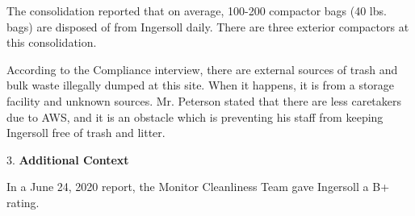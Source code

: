 The consolidation reported that on average, 100-200 compactor bags (40 lbs. bags) are disposed of from Ingersoll daily. There are three exterior compactors at this consolidation. 

According to the Compliance interview, there are external sources of trash and bulk waste illegally dumped at this site. When it happens, it is from a storage facility and unknown sources. Mr. Peterson stated that there are less caretakers due to AWS, and it is an obstacle which is preventing his staff from keeping Ingersoll free of trash and litter. 

3. \textbf{Additional Context}

In a June 24, 2020 report, the Monitor Cleanliness Team gave Ingersoll a B+ rating. 